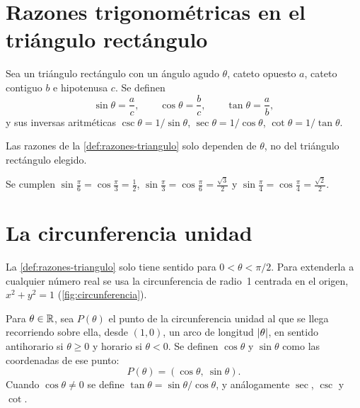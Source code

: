 \addtocounter{definicion}{1}%

\section{Razones trigonométricas en el triángulo rectángulo}

\begin{definicion}\label{def:razones-triangulo}
Sea un triángulo rectángulo con un ángulo agudo $\theta$, cateto opuesto $a$, cateto contiguo $b$ e hipotenusa $c$. Se definen
\[
\sin\theta=\frac{a}{c},\qquad \cos\theta=\frac{b}{c},\qquad \tan\theta=\frac{a}{b},
\]
y sus inversas aritméticas $\csc\theta=1/\sin\theta$, $\sec\theta=1/\cos\theta$, $\cot\theta=1/\tan\theta$.
\end{definicion}

\begin{proposicion}\label{prop:razones-bien-definidas}
Las razones de la \cref{def:razones-triangulo} solo dependen de $\theta$, no del triángulo rectángulo elegido.
\end{proposicion}

\begin{proposicion}\label{prop:notables}
Se cumplen $\sin\frac{\pi}{6}=\cos\frac{\pi}{3}=\frac12$, $\sin\frac{\pi}{3}=\cos\frac{\pi}{6}=\frac{\sqrt3}{2}$ y $\sin\frac{\pi}{4}=\cos\frac{\pi}{4}=\frac{\sqrt2}{2}$.
\end{proposicion}

\section{La circunferencia unidad}

La \cref{def:razones-triangulo} solo tiene sentido para $0<\theta<\pi/2$. Para extenderla a cualquier número real se usa la circunferencia de radio~1 centrada en el origen, $x^{2}+y^{2}=1$ (\cref{fig:circunferencia}).

\begin{definicion}\label{def:circunferencia}
Para $\theta\in\mathbb{R}$, sea $P(\theta)$ el punto de la circunferencia unidad al que se llega recorriendo sobre ella, desde $(1,0)$, un arco de longitud $\lvert\theta\rvert$, en sentido antihorario si $\theta\ge 0$ y horario si $\theta<0$. Se definen $\cos\theta$ y $\sin\theta$ como las coordenadas de ese punto:
\[
P(\theta)=(\cos\theta,\ \sin\theta).
\]
Cuando $\cos\theta\neq 0$ se define $\tan\theta=\sin\theta/\cos\theta$, y análogamente $\sec$, $\csc$ y $\cot$.
\end{definicion}

